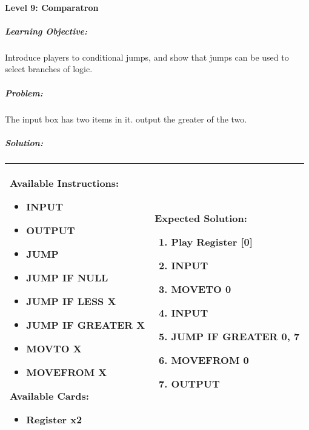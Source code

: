\paragraph{Level 9: Comparatron}
\subparagraph{Learning Objective:} Introduce players to conditional jumps, and show that jumps can be used to select branches of logic.

\subparagraph{Problem:} The input box has two items in it. output the greater of the two.

\subparagraph{Solution:} 
\begin{center}
    \begin{tabular}{ | m{5cm} | m{9cm} | } 
        \hline
            \textbf{Available Instructions:} 
            \begin{itemize}
                \item INPUT
                \item OUTPUT
                \item JUMP
                \item JUMP IF NULL
                \item JUMP IF LESS X
                \item JUMP IF GREATER X
                \item MOVTO X
                \item MOVEFROM X
            \end{itemize}
            \textbf{Available Cards:} 
            \begin{itemize}
                \item Register x2
            \end{itemize}& 
            \textbf{Expected Solution:} 
            \begin{enumerate}
                \item Play Register [0]
                \item INPUT
                \item MOVETO 0
                \item INPUT
                \item JUMP IF GREATER 0, 7
                \item MOVEFROM 0
                \item OUTPUT
            \end{enumerate}
            \\
        \hline
    \end{tabular}
\end{center}